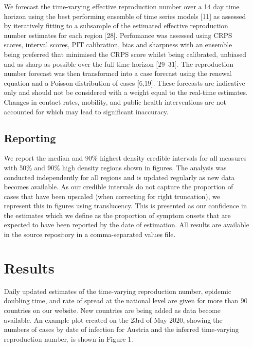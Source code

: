 \documentclass[
]{article}
\begin{document}
We forecast the time-varying effective reproduction number over a 14 day
time horizon using the best performing ensemble of time series models
{[}11{]} as assessed by iteratively fitting to a subsample of the
estimated effective reproduction number estimates for each region
{[}28{]}. Perfomance was assessed using CRPS scores, interval scores,
PIT calibration, bias and sharpness with an ensemble being preferred
that minimised the CRPS score whilst being calibrated, unbiased and as
sharp as possible over the full time horizon {[}29--31{]}. The
reproduction number forecast was then transformed into a case forecast
using the renewal equation and a Poisson distribution of cases
{[}6,19{]}. These forecasts are indicative only and should not be
considered with a weight equal to the real-time estimates. Changes in
contact rates, mobility, and public health interventions are not
accounted for which may lead to significant inaccuracy.

\hypertarget{reporting}{%
\subsection{Reporting}\label{reporting}}

We report the median and 90\% highest density credible intervals for all
measures with 50\% and 90\% high density regions shown in figures. The
analysis was conducted independently for all regions and is updated
regularly as new data becomes available. As our credible intervals do
not capture the proportion of cases that have been upscaled (when
correcting for right truncation), we represent this in figures using
translucency. This is presented as our confidence in the estimates which
we define as the proportion of symptom onsets that are expected to have
been reported by the date of estimation. All results are available in
the source repository in a comma-separated values file.

\hypertarget{results}{%
\section{Results}\label{results}}

Daily updated estimates of the time-varying reproduction number,
epidemic doubling time, and rate of spread at the national level are
given for more than 90 countries on our website. New countries are being
added as data become available. An example plot created on the 23rd of
May 2020, showing the numbers of cases by date of infection for Austria
and the inferred time-varying reproduction number, is shown in Figure 1.
\end{document}
